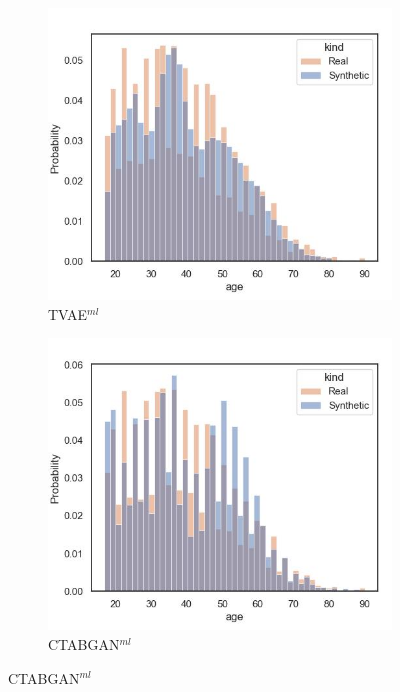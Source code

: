 \begin{figure}[h]
	\centering
	\begin{subfigure}{0.23\textwidth}
		\centering
		\includegraphics[width=\textwidth]{images/dist_age/tvae.jpg}
		\caption{TVAE$^{ml}$}
	\end{subfigure}
	\begin{subfigure}{0.23\textwidth}
		\centering
		\includegraphics[width=\textwidth]{images/dist_age/ctabgan.jpg}
		\caption{CTABGAN$^{ml}$}
	\end{subfigure}

\end{figure}
